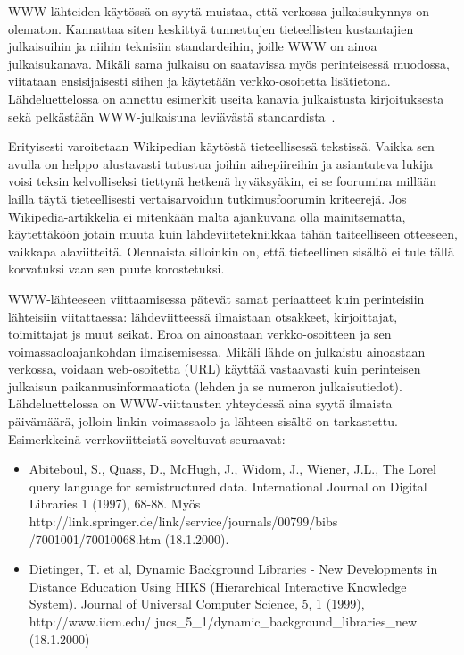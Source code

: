 \documentclass[finnish,gradu]{tktltiki}
\begin{document}
WWW-lähteiden käytössä on syytä muistaa, että verkossa julkaisukynnys on
olematon. Kannattaa siten keskittyä tunnettujen tieteellisten
kustantajien julkaisuihin ja niihin teknisiin standardeihin, joille WWW
on ainoa julkaisukanava. Mikäli sama julkaisu on saatavissa myös
perinteisessä muodossa, viitataan ensisijaisesti siihen ja käytetään
verkko-osoitetta lisätietona. Lähdeluettelossa on annettu esimerkit
useita kanavia julkaistusta kirjoituksesta~\cite{abiteboul,dietinger} sekä pelkästään
WWW-julkaisuna
leviävästä standardista~\cite{bray}.

Erityisesti varoitetaan Wikipedian käytöstä tieteellisessä tekstissä.
Vaikka sen avulla on helppo alustavasti tutustua joihin aihepiireihin ja
asiantuteva lukija voisi teksin kelvolliseksi tiettynä hetkenä
hyväksyäkin, ei se foorumina millään lailla täytä tieteellisesti
vertaisarvoidun tutkimusfoorumin kriteerejä.
Jos Wikipedia-artikkelia  ei mitenkään malta ajankuvana olla mainitsematta, käytettäköön jotain muuta kuin lähdeviitetekniikkaa tähän taiteelliseen otteeseen, vaikkapa alaviitteitä. Olennaista silloinkin on, että tieteellinen sisältö ei tule tällä korvatuksi vaan sen puute korostetuksi.

WWW-lähteeseen viittaamisessa pätevät samat periaatteet kuin
perinteisiin lähteisiin viitattaessa: lähdeviitteessä ilmaistaan
otsakkeet, kirjoittajat, toimittajat js muut seikat. Eroa on ainoastaan
verkko-osoitteen ja sen voimassaoloajankohdan ilmaisemisessa. Mikäli
lähde on julkaistu ainoastaan verkossa, voidaan web-osoitetta (URL)
käyttää vastaavasti kuin perinteisen julkaisun paikannusinformaatiota
(lehden ja se numeron julkaisutiedot). Lähdeluettelossa on WWW-viittausten yhteydessä aina syytä ilmaista päivämäärä, jolloin linkin voimassaolo ja lähteen sisältö on tarkastettu.
Esimerkkeinä verrkoviitteistä soveltuvat seuraavat:
\begin{itemize}
\item Abiteboul, S., Quass, D., McHugh, J., Widom, J., Wiener, J.L., The Lorel query language for semistructured data. International Journal on Digital Libraries 1 (1997), 68-88. Myös
http://link.springer.de/link/service/journals/00799/bibs /7001001/70010068.htm (18.1.2000).
\item 	
Dietinger, T. et al, Dynamic Background Libraries - New Developments in Distance Education Using HIKS (Hierarchical Interactive Knowledge System). Journal of Universal Computer Science, 5, 1 (1999),
http://www.iicm.edu/ jucs\_5\_1/dynamic\_background\_libraries\_new (18.1.2000)
\end{itemize}
\end{document}
